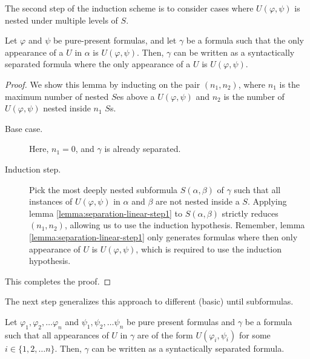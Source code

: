 \documentclass[a4paper,UKenglish,cleveref, autoref, thm-restate]{lipics-v2021}
\begin{document}
The second step of the induction scheme is to consider cases where $U(\varphi, \psi)$ is nested under multiple levels of $S$.
\begin{lemma}
\label{lemma:separation-linear-step2}
    Let $\varphi$ and $\psi$ be pure-present formulas, and let $\gamma$ be a formula such that the only appearance of a $U$ in $\alpha$ is $U(\varphi, \psi)$. Then, $\gamma$ can be written as a syntactically separated formula where the only appearance of a $U$ is $U(\varphi, \psi)$.
\end{lemma}
\begin{proof}
    We show this lemma by inducting on the pair $(n_1, n_2)$, where $n_1$ is the maximum number of nested $S$es above a $U(\varphi, \psi)$ and $n_2$ is the number of $U(\varphi, \psi)$ nested inside $n_1$ $S$s.
    \begin{description}
        \item[Base case.] Here, $n_1 = 0$, and $\gamma$ is already separated.
        \item[Induction step.] Pick the most deeply nested subformula $S(\alpha, \beta)$ of $\gamma$ such that all instances of $U(\varphi, \psi)$ in $\alpha$ and $\beta$ are not nested inside a $S$. Applying lemma \ref{lemma:separation-linear-step1} to $S(\alpha, \beta)$ strictly reduces $(n_1, n_2)$, allowing us to use the induction hypothesis. Remember, lemma \ref{lemma:separation-linear-step1} only generates formulas where then only appearance of $U$ is $U(\varphi, \psi)$, which is required to use the induction hypothesis.
    \end{description}
    This completes the proof.
\end{proof}
The next step generalizes this approach to different (basic) until subformulas.
\begin{lemma}
\label{lemma:separation-linear-step3}
    Let $\varphi_1, \varphi_2, \ldots \varphi_n$ and $\psi_1, \psi_2, \ldots \psi_n$ be pure present formulas and $\gamma$ be a formula such that all appearances of $U$ in $\gamma$ are of the form $U(\varphi_i, \psi_i)$ for some $i \in \{1, 2, \ldots n\}$. Then, $\gamma$ can be written as a syntactically separated formula.
\end{lemma}
\end{document}
